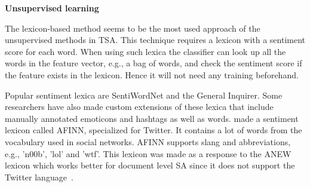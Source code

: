 \noindent
\textbf{Unsupervised learning} \\
\noindent 

The lexicon-based method seems to be the most used approach of the unsupervised methods in TSA. This technique requires a lexicon with a sentiment score for each word. When using such lexica the classifier can look up all the words in the feature vector, e.g., a bag of words, and check the sentiment score if the feature exists in the lexicon. Hence it will not need any training beforehand.
	
Popular sentiment lexica are SentiWordNet and the General Inquirer. Some researchers have also made custom extensions of these lexica that include manually annotated emoticons and hashtags as well as words. \cite{article:afinn} made a sentiment lexicon called AFINN, specialized for Twitter. It contains a lot of words from the vocabulary used in social networks. AFINN supports slang and abbreviations, e.g., 'n00b', 'lol' and 'wtf'. This lexicon was made as a response to the ANEW lexicon which works better for document level SA since it does not support the Twitter language~\citep{article:afinn}.